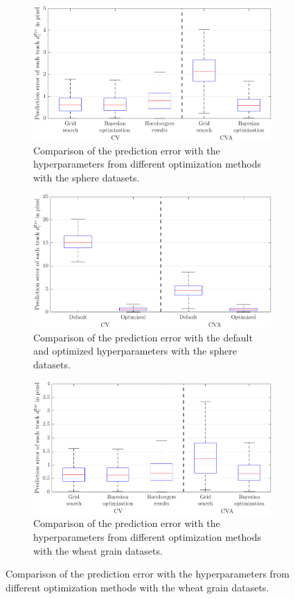 \begin{figure}
    \centering
	\begin{subfigure}[t]{0.8\textwidth}
		\includegraphics[width=\textwidth]{figures/KF/bayopt/effectOpt kugeln1.png}
		\caption{Comparison of the prediction error with the hyperparameters from different optimization methods with the sphere datasets.}
	\end{subfigure}
	\begin{subfigure}[t]{0.8\textwidth}
		\includegraphics[width=\textwidth]{figures/KF/bayopt/effectOpt kugeln2.png}
		\caption{Comparison of the prediction error with the default and optimized hyperparameters with the sphere datasets.}
	\end{subfigure}
	\begin{subfigure}[t]{0.8\textwidth}
		\includegraphics[width=\textwidth]{figures/KF/bayopt/effectOpt weizen1.png}
		\caption{Comparison of the prediction error with the hyperparameters from different optimization methods with the wheat grain datasets.}
	\end{subfigure}
\end{figure}

